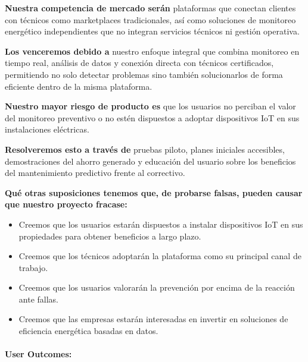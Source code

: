 \textbf{Nuestra competencia de mercado serán} plataformas que conectan
clientes con técnicos como marketplaces tradicionales, así como
soluciones de monitoreo energético independientes que no integran
servicios técnicos ni gestión operativa.

\textbf{Los venceremos debido a} nuestro enfoque integral que combina
monitoreo en tiempo real, análisis de datos y conexión directa con
técnicos certificados, permitiendo no solo detectar problemas sino
también solucionarlos de forma eficiente dentro de la misma plataforma.

\textbf{Nuestro mayor riesgo de producto es} que los usuarios no
perciban el valor del monitoreo preventivo o no estén dispuestos a
adoptar dispositivos IoT en sus instalaciones eléctricas.

\textbf{Resolveremos esto a través de} pruebas piloto, planes iniciales
accesibles, demostraciones del ahorro generado y educación del usuario
sobre los beneficios del mantenimiento predictivo frente al correctivo.

\textbf{Qué otras suposiciones tenemos que, de probarse falsas, pueden
causar que nuestro proyecto fracase:}

\begin{itemize}
\item
  Creemos que los usuarios estarán dispuestos a instalar dispositivos
  IoT en sus propiedades para obtener beneficios a largo plazo.
\item
  Creemos que los técnicos adoptarán la plataforma como su principal
  canal de trabajo.
\item
  Creemos que los usuarios valorarán la prevención por encima de la
  reacción ante fallas.
\item
  Creemos que las empresas estarán interesadas en invertir en soluciones
  de eficiencia energética basadas en datos.
\end{itemize}

\paragraph{User
Outcomes:}\label{report__10-cap1-introduccion.md__user-outcomes}


